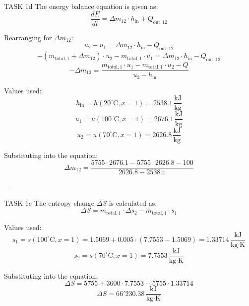 TASK 1d  
The energy balance equation is given as:  
\[
\frac{dE}{dt} = \Delta m_{12} \cdot h_{\text{in}} + Q_{\text{out},12}
\]  

Rearranging for \( \Delta m_{12} \):  
\[
u_2 - u_1 = \Delta m_{12} \cdot h_{\text{in}} - Q_{\text{out},12}
\]  
\[
-\left( m_{\text{total},1} + \Delta m_{12} \right) \cdot u_2 - m_{\text{total},1} \cdot u_1 = \Delta m_{12} \cdot h_{\text{in}} - Q_{\text{out},12}
\]  
\[
-\Delta m_{12} = \frac{m_{\text{total},1} \cdot u_1 - m_{\text{total},1} \cdot u_2 - Q}{u_2 - h_{\text{in}}}
\]  

Values used:  
\[
h_{\text{in}} = h(20^\circ\text{C}, x=1) = 2538.1 \, \frac{\text{kJ}}{\text{kg}}
\]  
\[
u_1 = u(100^\circ\text{C}, x=1) = 2676.1 \, \frac{\text{kJ}}{\text{kg}}
\]  
\[
u_2 = u(70^\circ\text{C}, x=1) = 2626.8 \, \frac{\text{kJ}}{\text{kg}}
\]  

Substituting into the equation:  
\[
\Delta m_{12} = \frac{5755 \cdot 2676.1 - 5755 \cdot 2626.8 - 100}{2626.8 - 2538.1}
\]  

---

TASK 1e  
The entropy change \( \Delta S \) is calculated as:  
\[
\Delta S = m_{\text{total},1} \cdot \Delta s_2 - m_{\text{total},1} \cdot s_1
\]  

Values used:  
\[
s_1 = s(100^\circ\text{C}, x=1) = 1.5069 + 0.005 \cdot (7.7553 - 1.5069) = 1.33714 \, \frac{\text{kJ}}{\text{kg·K}}
\]  
\[
s_2 = s(70^\circ\text{C}, x=1) = 7.7553 \, \frac{\text{kJ}}{\text{kg·K}}
\]  

Substituting into the equation:  
\[
\Delta S = 5755 + 3600 \cdot 7.7553 - 5755 \cdot 1.33714
\]  
\[
\Delta S = 66'230.38 \, \frac{\text{kJ}}{\text{kg·K}}
\]  